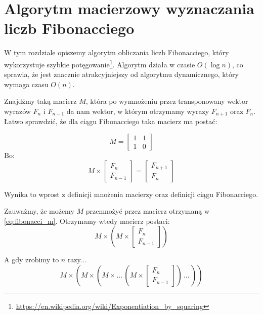 \section{Algorytm macierzowy wyznaczania liczb Fibonacciego}

W tym rozdziale opiszemy algorytm obliczania liczb Fibonacciego, który wykorzystuje szybkie 
potęgowanie\footnote{\url{https://en.wikipedia.org/wiki/Exponentiation_by_squaring}}. 
Algorytm działa w czasie $O(\log{n})$, co sprawia, że jest znacznie atrakcyjniejszy od algorytmu 
dynamicznego, który wymaga czasu $O(n)$.

Znajdźmy taką macierz $M$, która po wymnożeniu przez transponowany wektor wyrazów 
$F_{n}$ i $F_{n - 1}$ da nam wektor, w którym otrzymamy wyrazy $F_{n + 1}$ oraz $F_{n}$. 
Łatwo sprawdzić, że dla ciągu Fibonacciego taka macierz ma postać:


\begin{equation}
	M = \begin{bmatrix}1 & 1\\1 & 0\end{bmatrix}
\end{equation}
Bo:
\begin{equation}
\label{eq:fibonacci_m}
	M \times
	\begin{bmatrix}F_n \\ F_{n - 1}\end{bmatrix}
	= \begin{bmatrix}F_{n + 1} \\ F_{n}\end{bmatrix}
\end{equation}

Wynika to wprost z definicji mnożenia macierzy oraz definicji ciągu Fibonacciego.


\begin{observation}{Zauważmy, że możemy $M$ przemnożyć przez macierz otrzymaną w \ref{eq:fibonacci_m}. Otrzymamy wtedy macierz postaci:}
\begin{equation}
	M \times (M \times \begin{bmatrix}F_n \\ F_{n - 1}\end{bmatrix})
\end{equation}
\end{observation}

\begin{observation}{A gdy zrobimy to $n$ razy...}
\label{obs:mult-n-times}
\begin{equation}
	M \times (M \times (M \times ...\, (M \times \begin{bmatrix}F_n \\ F_{n - 1}\end{bmatrix})\,...\,))
\end{equation}
\end{observation}

